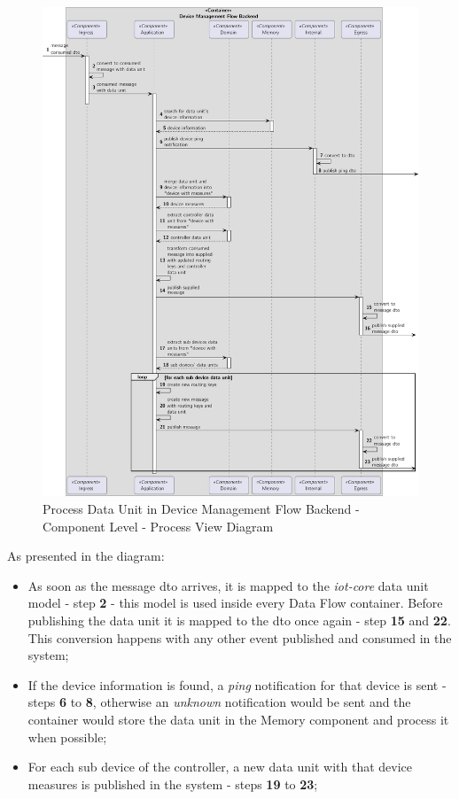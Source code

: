 \begin{figure}[H]
   \centering
   \includegraphics[page=1,width=\columnwidth]{assets/diagrams/design/architectural/level3/process/device-management-flow-backend.pdf}
   \caption[Process Data Unit in Device Management Flow Backend - Component Level - Process View Diagram]{Process Data Unit in Device Management Flow Backend - Component Level - Process View Diagram}
   \label{fig:design:architecture:platform:component:process:diagram:device}
\end{figure}

As presented in the diagram:

\begin{itemize}
   \item As soon as the message dto arrives, it is mapped to the \textit{iot-core} data unit model - step \textbf{2} - this model is used inside every Data Flow container. Before publishing the data unit it is mapped to the dto once again - step \textbf{15} and \textbf{22}. This conversion happens with any other event published and consumed in the system;
   \item If the device information is found, a \textit{ping} notification for that device is sent - steps \textbf{6} to \textbf{8}, otherwise an \textit{unknown} notification would be sent and the container would store the data unit in the Memory component and process it when possible;
   \item For each sub device of the controller, a new data unit with that device measures is published in the system - steps \textbf{19} to \textbf{23};
\end{itemize}

